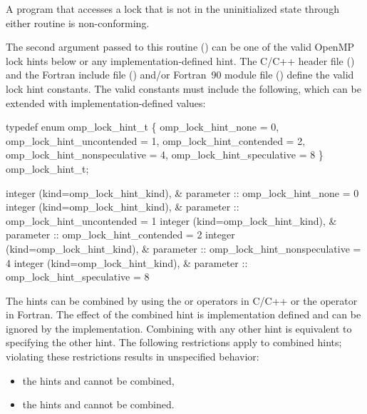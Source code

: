 \constraints
A program that accesses a lock that is not in the uninitialized state through either routine 
is non-conforming.

The second argument passed to this routine () can be one of the valid OpenMP lock hints below or any implementation-defined hint. 
The C/C++ header file () and the Fortran include file () and/or Fortran~90 module file () define the valid lock hint constants.  
The valid constants must include the following, which can be extended with implementation-defined values:

\ccppspecificstart
\begin{codepar}
typedef enum omp\_lock\_hint\_t \{
  omp\_lock\_hint\_none = 0,
  omp\_lock\_hint\_uncontended = 1,
  omp\_lock\_hint\_contended = 2,
  omp\_lock\_hint\_nonspeculative = 4,
  omp\_lock\_hint\_speculative = 8
\} omp\_lock\_hint\_t;
\end{codepar}
\ccppspecificend

\fortranspecificstart
\begin{codepar}
integer (kind=omp\_lock\_hint\_kind), &
        parameter :: omp\_lock\_hint\_none = 0
integer (kind=omp\_lock\_hint\_kind), &
        parameter :: omp\_lock\_hint\_uncontended = 1
integer (kind=omp\_lock\_hint\_kind), &
        parameter :: omp\_lock\_hint\_contended = 2
integer (kind=omp\_lock\_hint\_kind), &
        parameter :: omp\_lock\_hint\_nonspeculative = 4 
integer (kind=omp\_lock\_hint\_kind), &
        parameter :: omp\_lock\_hint\_speculative = 8
\end{codepar}
\fortranspecificend

The hints can be combined by using the \code{+} or \code{|} operators in C/C++ or the \code{+} operator in Fortran.  
The effect of the combined hint is implementation defined and can be ignored by the implementation.
Combining  with any other hint is equivalent to specifying the other hint.
The following restrictions apply to combined hints; violating these 
restrictions results in unspecified behavior:
\begin{itemize}
\item the hints  and  cannot be combined,
\item the hints  and  cannot be combined.
\end{itemize}


